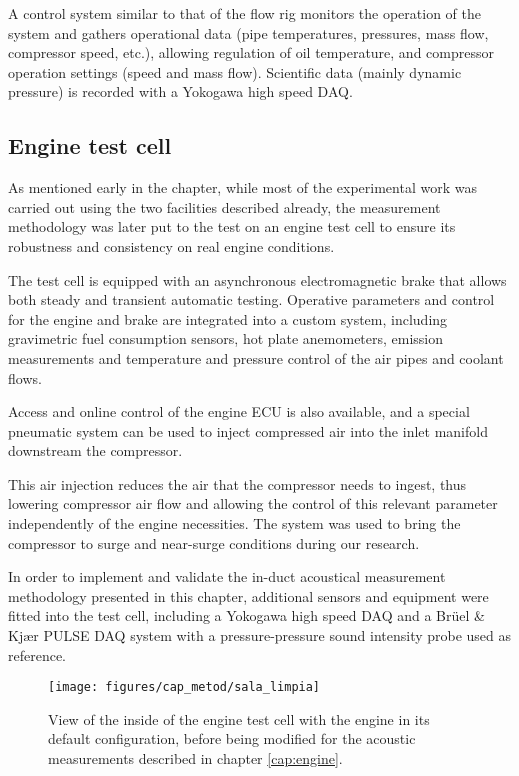 A control system similar to that of the flow rig monitors the operation of the system and gathers operational data (pipe temperatures, pressures, mass flow, compressor speed, etc.), allowing regulation of oil temperature, and compressor operation settings (speed and mass flow). Scientific data (mainly dynamic pressure) is recorded with a Yokogawa high speed DAQ.

\subsection{Engine test cell} \label{sub:engine_cell}

As mentioned early in the chapter, while most of the experimental work was carried out using the two facilities described already, the measurement methodology was later put to the test on an engine test cell to ensure its robustness and consistency on real engine conditions.

The test cell is equipped with an asynchronous electromagnetic brake that allows both steady and transient automatic testing. Operative parameters and control for the engine and brake are integrated into a custom system, including gravimetric fuel consumption sensors, hot plate anemometers, emission measurements and temperature and pressure control of the air pipes and coolant flows.

Access and online control of the engine ECU is also available, and a special pneumatic system can be used to inject compressed air into the inlet manifold downstream the compressor.

This air injection reduces the air that the compressor needs to ingest, thus lowering compressor air flow and allowing the control of this relevant parameter independently of the engine necessities. The system was used to bring the compressor to surge and near-surge conditions during our research.

In order to implement and validate the in-duct acoustical measurement methodology presented in this chapter, additional sensors and equipment were fitted into the test cell, including a Yokogawa high speed DAQ and a Brüel \& Kjær PULSE DAQ system with a pressure-pressure sound intensity probe used as reference.

\begin{figure}[b!]
\centering
\texttt{[image: figures/cap\_metod/sala\_limpia]}
\caption{View of the inside of the engine test cell with the engine in its default configuration, before being modified for the acoustic measurements described in chapter \ref{cap:engine}.}
\label{fig:engine_cell_clear}
\end{figure}

